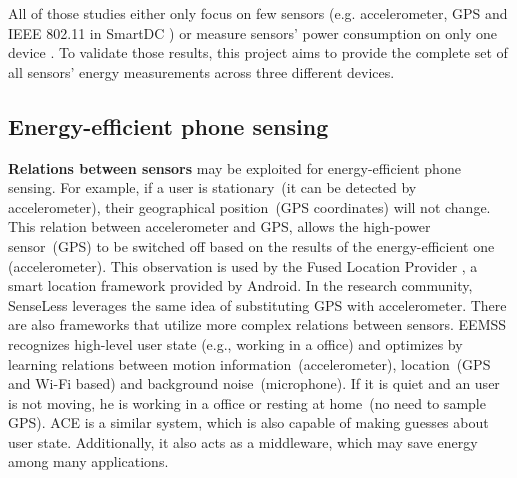 All of those studies either only focus on few sensors (e.g. accelerometer, GPS and IEEE 802.11 in SmartDC \cite{chon:smartdc}) or measure sensors' power consumption on only one device \cite{benabdesslem:senseless}. To validate those results, this project aims to provide the complete set of all sensors' energy measurements across three different devices. 
	
\subsection{Energy-efficient phone sensing}
\hspace{10pt} \textbf{Relations between sensors} may be exploited for energy-efficient phone sensing. For example, if a user is stationary\ (it can be detected by accelerometer), their geographical position\ (GPS coordinates) will not change. This relation between accelerometer and GPS, allows the high-power sensor\ (GPS) to be switched off based on the results of the energy-efficient one (accelerometer). This observation is used by the Fused Location Provider \cite{android:locationapi}, a smart location framework provided by Android. In the research community, SenseLess \cite{benabdesslem:senseless} leverages the same idea of substituting GPS with accelerometer. There are also frameworks that utilize more complex relations between sensors. EEMSS \cite{wang:eemss} recognizes high-level user state (e.g., working in a office) and optimizes by learning relations between motion information\ (accelerometer), location\ (GPS and Wi-Fi based) and background noise\ (microphone). If it is quiet and an user is not moving, he is working in a office or resting at home\ (no need to sample GPS). ACE \cite{nath:ace} is a similar system, which is also capable of making guesses about user state. Additionally, it also acts as a middleware, which may save energy among many applications.

